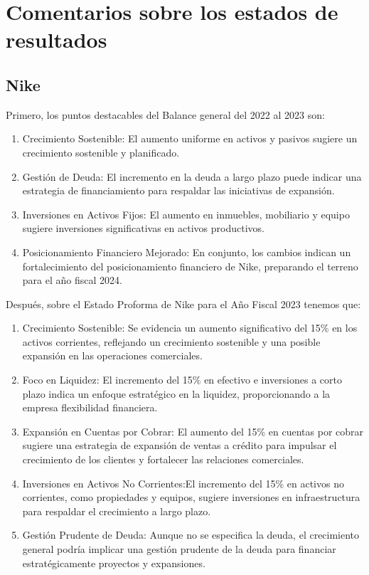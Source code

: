 \documentclass[a4paper,12pt]{article}
\begin{document}
\clearpage
\newpage


\section{Comentarios sobre los estados de resultados}

\subsection{Nike}

Primero, los puntos destacables del Balance general del 2022 al 2023 son:
\begin{enumerate}
	\item Crecimiento Sostenible: El aumento uniforme en activos y pasivos sugiere un crecimiento sostenible y planificado.
	\item Gestión de Deuda: El incremento en la deuda a largo plazo puede indicar una estrategia de financiamiento para respaldar las iniciativas de expansión.
	\item Inversiones en Activos Fijos: El aumento en inmuebles, mobiliario y equipo sugiere inversiones significativas en activos productivos.
	\item Posicionamiento Financiero Mejorado: En conjunto, los cambios indican un fortalecimiento del posicionamiento financiero de Nike, preparando el terreno para el año fiscal 2024.
\end{enumerate}

Después, sobre el Estado Proforma de Nike para el Año Fiscal 2023 tenemos que:
\begin{enumerate}
	\item Crecimiento Sostenible: Se evidencia un aumento significativo del 15\% en los activos corrientes, reflejando un crecimiento sostenible y una posible expansión en las operaciones comerciales.
	\item Foco en Liquidez: El incremento del 15\% en efectivo e inversiones a corto plazo indica un enfoque estratégico en la liquidez, proporcionando a la empresa flexibilidad financiera.
	\item Expansión en Cuentas por Cobrar: El aumento del 15\% en cuentas por cobrar sugiere una estrategia de expansión de ventas a crédito para impulsar el crecimiento de los clientes y fortalecer las relaciones comerciales.
	\item Inversiones en Activos No Corrientes:El incremento del 15\% en activos no corrientes, como propiedades y equipos, sugiere inversiones en infraestructura para respaldar el crecimiento a largo plazo.
	\item Gestión Prudente de Deuda: Aunque no se especifica la deuda, el crecimiento general podría implicar una gestión prudente de la deuda para financiar estratégicamente proyectos y expansiones.
\end{enumerate}
\end{document}
